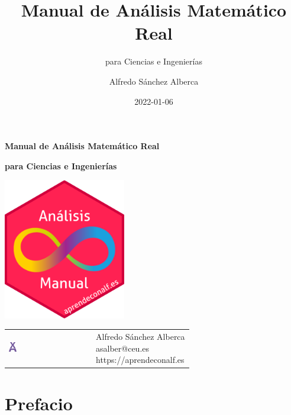 \documentclass[
  a4paper,
]{scrreport}
\title{Manual de Análisis Matemático Real}
\subtitle{para Ciencias e Ingenierías}
\author{Alfredo Sánchez Alberca}
\date{2022-01-06}
\renewcommand*\contentsname{Indice de contenidos}
\newcommand\contentsname{Indice de contenidos}
\theoremstyle{definition}
\theoremstyle{plain}
\theoremstyle{definition}
\theoremstyle{definition}
\theoremstyle{plain}
\theoremstyle{plain}
\theoremstyle{remark}
\begin{document}
\begin{titlepage}

\begin{center}
\vspace*{5cm}

\Huge
{\textbf{\textsf{Manual de Análisis Matemático Real}}}

\vspace{0.5cm}
\LARGE
{\textbf{\textsf{para Ciencias e Ingenierías}}}

\vspace{1.5cm}

\includegraphics[width=0.4\textwidth]{img/logos/sticker.png}
\end{center}

\vfill

\begin{flushleft}
\begin{tabular}{ll}
\includegraphics[width=0.1\textwidth]{img/logos/aprendeconalf.png} & \parbox[b]{5cm}{\Large\textsf{Alfredo
Sánchez
Alberca}\\ \textsf{asalber@ceu.es} \\ \textsf{https://aprendeconalf.es}}
\end{tabular}
\end{flushleft}
\end{titlepage}
\renewcommand*\contentsname{Indice de contenidos}
{
\hypersetup{linkcolor=}
\setcounter{tocdepth}{2}
\tableofcontents
}


\chapter*{Prefacio}\label{prefacio}
\end{document}

